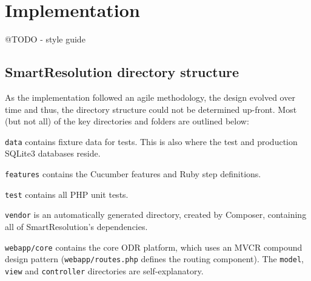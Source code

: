 \chapter{Implementation} %

@TODO - style guide


\section{SmartResolution directory structure}

As the implementation followed an agile methodology, the design evolved over time and thus, the directory structure could not be determined up-front. Most (but not all) of the key directories and folders are outlined below:

\begin{samepage}
\end{samepage}

\lstinline{data} contains fixture data for tests. This is also where the test and production SQLite3 databases reside.

\lstinline{features} contains the Cucumber features and Ruby step definitions.

\lstinline{test} contains all PHP unit tests.

\lstinline{vendor} is an automatically generated directory, created by Composer, containing all of SmartResolution's dependencies.

\lstinline{webapp/core} contains the core ODR platform, which uses an MVCR compound design pattern (\lstinline{webapp/routes.php} defines the routing component). The \lstinline{model}, \lstinline{view} and \lstinline{controller} directories are self-explanatory.

